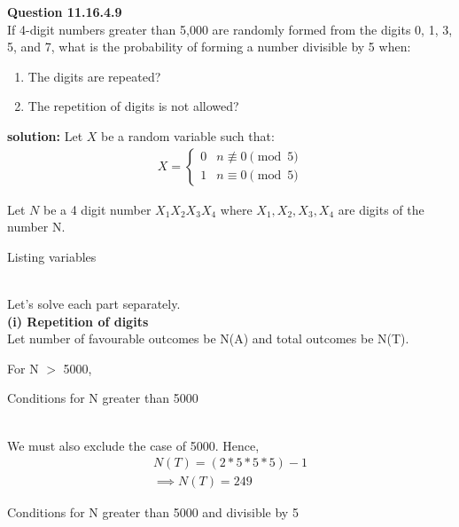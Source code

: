 \documentclass{article}
\begin{document}
\providecommand{\pr}[1]{\ensuremath{\Pr\left(#1\right)}}
\providecommand{\brak}[1]{\ensuremath{\left(#1\right)}}
\newcommand{\solution}{\noindent \textbf{solution: }}

\textbf{Question 11.16.4.9}\\
If 4-digit numbers greater than 5,000 are randomly formed from the digits 0, 1, 3, 5, and 7, what is the probability of forming a number divisible by 5 when:
\begin{enumerate}
    \item The digits are repeated?
    \item The repetition of digits is not allowed?
\end{enumerate}

\solution
Let $X$ be a random variable such that:
\begin{align}
	X = \begin{cases}
		0 & n \not\equiv 0 \pmod{5}\\
		1 & n \equiv 0 \pmod{5}\end{cases}
\end{align}

Let $N$ be a 4 digit number $X_{1}X_{2}X_{3}X_{4}$ where $X_{1},X_{2},X_{3},X_{4}$ are digits of the number N.

\begin{table}[h]
    \centering
    
    \caption{Listing variables}
    \label{table_1}
    \end{table}
\\

Let's solve each part separately. \\

\textbf{(i) Repetition of digits}\\
Let number of favourable outcomes be N(A) and total outcomes be N(T).

For N $>$ 5000,

\begin{table}[h]
    \centering
    
    \caption{Conditions for N greater than 5000}
    \label{table_2}
    \end{table}
\\

We must also exclude the case of 5000.
Hence,
\begin{align}
	N(T)=(2*5*5*5)-1 \\
	\implies N(T)=249
\end{align}

\begin{table}[h]
    \centering
    
    \caption{Conditions for N greater than 5000 and divisible by 5}
    \label{table_3}
    \end{table}
\\
\end{document}
